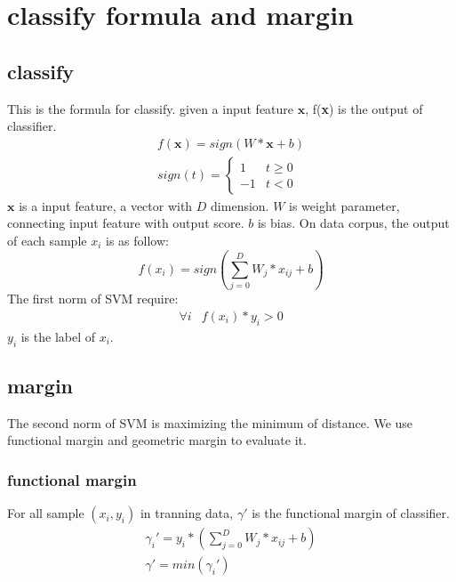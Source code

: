 \documentclass[11pt]{article}
\begin{document}
\section{classify formula and margin}
\subsection{classify}
This is the formula for classify. given a input feature $\textbf{x}$, f(\textbf{x}) is the output of classifier.
\begin{equation}
\begin{array}{lr}
f(\textbf{x}) = sign(W * \textbf{x} + b) \\
sign(t) =
\left\{
\begin{array}{lr}
1 &              t \geq   0 \\
-1 & t <0 
\end{array}
\right.
\end{array}
\end{equation}
$\textbf{x}$ is a input feature, a vector with $D$ dimension.  $W$ is weight parameter, connecting input feature with output score. $b$ is bias.
On data corpus, the output of each sample $x_i$ is as follow:
\begin{equation}
f(x_i) = sign( \sum_{j=0}^{D}W_j * x_{ij} + b)
\end{equation}
The first norm of SVM require:
\begin{equation}
\begin{array}{lr}
  \forall i  & f(x_i) * y_i > 0
  \end{array}
\end{equation}
$y_i$ is the label of $x_i$.

\subsection{margin}
The second norm of SVM is maximizing the minimum of distance. We use functional margin and geometric margin to evaluate it.
\subsubsection{functional margin}
For all sample $(x_i,y_i)$ in tranning data, ${\gamma}'$ is the functional margin of classifier.
\begin{equation}
\begin{array}{lr}
{\gamma_i}'  = y_i * (\sum_{j=0}^{D}W_j * x_{ij} + b) \\
{\gamma}' = min({\gamma_i}')
\end{array}
\end{equation}
\end{document}

